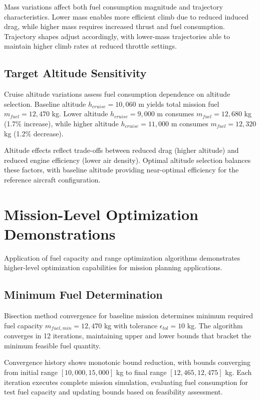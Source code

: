 Mass variations affect both fuel consumption magnitude and trajectory characteristics. Lower mass enables more efficient climb due to reduced induced drag, while higher mass requires increased thrust and fuel consumption. Trajectory shapes adjust accordingly, with lower-mass trajectories able to maintain higher climb rates at reduced throttle settings.

\subsection{Target Altitude Sensitivity}

Cruise altitude variations assess fuel consumption dependence on altitude selection. Baseline altitude $h_{cruise} = 10,060$ m yields total mission fuel $m_{fuel} = 12,470$ kg. Lower altitude $h_{cruise} = 9,000$ m consumes $m_{fuel} = 12,680$ kg (1.7\% increase), while higher altitude $h_{cruise} = 11,000$ m consumes $m_{fuel} = 12,320$ kg (1.2\% decrease).

Altitude effects reflect trade-offs between reduced drag (higher altitude) and reduced engine efficiency (lower air density). Optimal altitude selection balances these factors, with baseline altitude providing near-optimal efficiency for the reference aircraft configuration.

\section{Mission-Level Optimization Demonstrations}

Application of fuel capacity and range optimization algorithms demonstrates higher-level optimization capabilities for mission planning applications.

\subsection{Minimum Fuel Determination}

Bisection method convergence for baseline mission determines minimum required fuel capacity $m_{fuel,min} = 12,470$ kg with tolerance $\epsilon_{tol} = 10$ kg. The algorithm converges in 12 iterations, maintaining upper and lower bounds that bracket the minimum feasible fuel quantity.

Convergence history shows monotonic bound reduction, with bounds converging from initial range $[10,000, 15,000]$ kg to final range $[12,465, 12,475]$ kg. Each iteration executes complete mission simulation, evaluating fuel consumption for test fuel capacity and updating bounds based on feasibility assessment.

